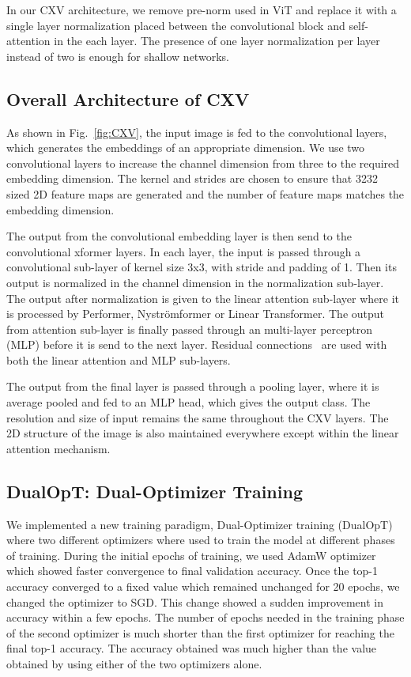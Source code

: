 \documentclass{article}
\begin{document}
In our CXV architecture, we remove pre-norm used in ViT and replace it with a single layer normalization placed between the convolutional block and self-attention in the each layer. The presence of one layer normalization per layer instead of two is enough for shallow networks. 

\subsection{Overall Architecture of CXV}


As shown in Fig.~\ref{fig:CXV}, the input image is fed to the convolutional layers, which generates the embeddings of an appropriate dimension. We use two convolutional layers to increase the channel dimension from three to the required embedding dimension. The kernel and strides are chosen to ensure that 3232 sized 2D feature maps are generated and the number of feature maps matches the embedding dimension.

The output from the convolutional embedding layer is then send to the convolutional xformer layers. In each layer, the input is passed through a convolutional sub-layer of kernel size 3x3, with stride and padding of 1. Then its output is normalized in the channel dimension in the normalization sub-layer. The output after normalization is given to the linear attention sub-layer where it is processed by Performer, Nyströmformer or Linear Transformer. The output from attention sub-layer is finally passed through an multi-layer perceptron (MLP) before it is send to the next layer. Residual connections~\cite{he2015deep} are used with both the linear attention and MLP sub-layers.

The output from the final layer is passed through a pooling layer, where it is average pooled and fed to an MLP head, which gives the output class. The resolution and size of input remains the same throughout the CXV layers. The 2D structure of the image is also maintained everywhere except within the linear attention mechanism.


\subsection{DualOpT: Dual-Optimizer Training}
We implemented a new training paradigm, Dual-Optimizer training (DualOpT) where two different optimizers where used to train the model at different phases of training. During the initial epochs of training, we used AdamW optimizer which showed faster convergence to final validation accuracy. Once the top-1 accuracy converged to a fixed value which remained unchanged for 20 epochs, we changed the optimizer to SGD. This change showed a sudden improvement in accuracy within a few epochs. The number of epochs needed in the training phase of the second optimizer is much shorter than the first optimizer for reaching the final top-1 accuracy. The accuracy obtained was much higher than the value obtained by using either of the two optimizers alone. 
\end{document}
